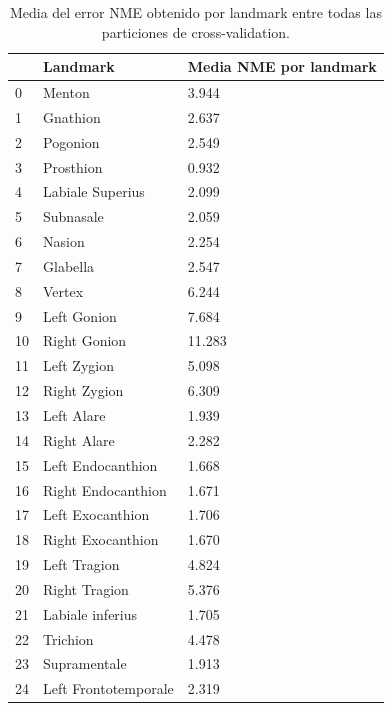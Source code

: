         \begin{table}[!ht]
            \centering
            \caption{Media del error NME obtenido por landmark entre todas las particiones de cross-validation.}
            \begin{tabular}{|l|l|l|}
            \hline
                ~ & Landmark & Media NME por landmark \\ \hline
                0 & Menton & 3.944 \\ \hline
                1 & Gnathion & 2.637 \\ \hline
                2 & Pogonion & 2.549 \\ \hline
                3 & Prosthion & 0.932 \\ \hline
                4 & Labiale Superius & 2.099 \\ \hline
                5 & Subnasale & 2.059 \\ \hline
                6 & Nasion & 2.254 \\ \hline
                7 & Glabella & 2.547 \\ \hline
                8 & Vertex & 6.244 \\ \hline
                9 & Left Gonion & 7.684 \\ \hline
                10 & Right Gonion & 11.283 \\ \hline
                11 & Left Zygion & 5.098 \\ \hline
                12 & Right Zygion & 6.309 \\ \hline
                13 & Left Alare & 1.939 \\ \hline
                14 & Right Alare & 2.282 \\ \hline
                15 & Left Endocanthion & 1.668 \\ \hline
                16 & Right Endocanthion & 1.671 \\ \hline
                17 & Left Exocanthion & 1.706 \\ \hline
                18 & Right Exocanthion & 1.670 \\ \hline
                19 & Left Tragion & 4.824 \\ \hline
                20 & Right Tragion & 5.376 \\ \hline
                21 & Labiale inferius & 1.705 \\ \hline
                22 & Trichion & 4.478 \\ \hline
                23 & Supramentale & 1.913 \\ \hline
                24 & Left Frontotemporale & 2.319 \\ \hline

\end{tabular}
\end{table}
